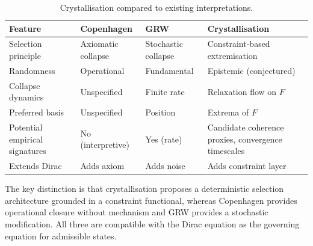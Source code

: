 \documentclass[12pt]{article}
\begin{document}
\begin{table}[ht]
\centering
\caption{Crystallisation compared to existing interpretations.}
\label{tab:interpretations}
\begin{tabular}{@{}llll@{}}
\toprule
Feature & Copenhagen & GRW & Crystallisation \\
\midrule
Selection principle & Axiomatic collapse & Stochastic collapse & Constraint-based extremisation \\
Randomness & Operational & Fundamental & Epistemic (conjectured) \\
Collapse dynamics & Unspecified & Finite rate & Relaxation flow on $F$ \\
Preferred basis & Unspecified & Position & Extrema of $F$ \\
Potential empirical signatures & No (interpretive) & Yes (rate) & Candidate coherence proxies, convergence timescales \\
Extends Dirac & Adds axiom & Adds noise & Adds constraint layer \\
\bottomrule
\end{tabular}
\end{table}

The key distinction is that crystallisation proposes a deterministic selection architecture grounded in a constraint functional, whereas Copenhagen provides operational closure without mechanism and GRW provides a stochastic modification. All three are compatible with the Dirac equation as the governing equation for admissible states.



\end{document}
